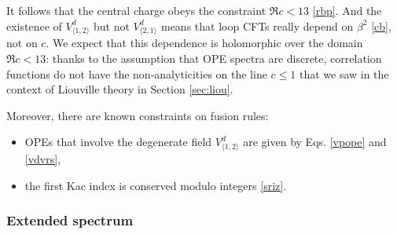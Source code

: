 \documentclass[12pt, a4paper]{article}
\begin{document}
It follows that the central charge obeys the constraint $\Re c<13$ \eqref{rbp}. And the existence of $V^d_{\langle 1,2\rangle}$ but not $V^d_{\langle 2,1\rangle}$ means that loop CFTs really depend on $\beta^2$ \eqref{cb}, not on $c$. We expect that this dependence is holomorphic over the domain $\Re c<13$: thanks to the assumption that OPE spectra are discrete, correlation functions do not have the non-analyticities on the line $c\leq 1$ that we saw in the context of Liouville theory in Section \ref{sec:liou}.

Moreover, there are known constraints on fusion rules:
\begin{itemize}
\item OPEs that involve the degenerate field $V^d_{\langle 1,2\rangle}$ are given by Eqs. \eqref{vpope} and \eqref{vdvrs},
 \item the first Kac index is conserved modulo integers \eqref{sriz}.
\end{itemize}

\subsubsection{Extended spectrum}\label{sec:es}
\end{document}
